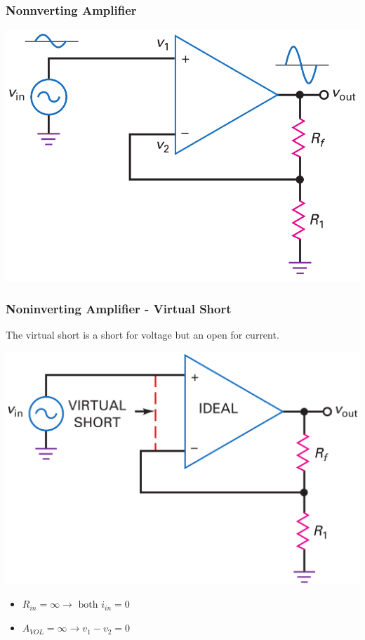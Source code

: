\documentclass[pdflatex,compress]{beamer}
\begin{document}
\begin{frame}
	\frametitle{Nonnverting Amplifier}
	\begin{center}
		\includegraphics[width=0.7\linewidth]{img/fig1618}
	\end{center}
\end{frame}

\begin{frame}
	\frametitle{Noninverting Amplifier - Virtual Short}
	The virtual short is a short for voltage but an open for current.
	\begin{multicols}{2}
		\begin{center}
			\includegraphics[width=\linewidth]{img/fig1619}
		\end{center}
		\columnbreak
		\begin{itemize}
			\item $R_{in} = \infty \rightarrow \text{ both } i_{in} = 0$
			\item $A_{VOL} = \infty \rightarrow v_1 - v_2 = 0$
		\end{itemize}
	\end{multicols}
\end{frame}
\end{document}
